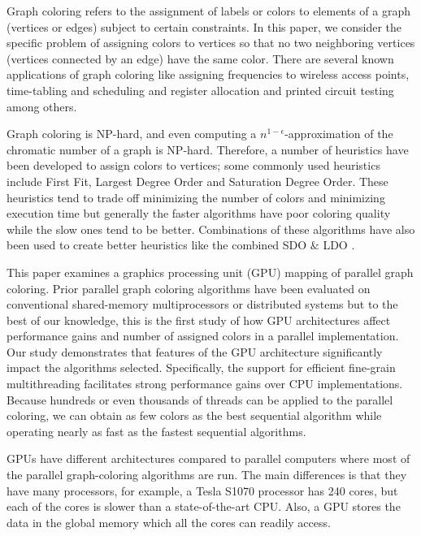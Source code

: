 \documentclass[preprint]{sigplanconf}
\begin{document}
Graph coloring refers to the assignment of labels or colors to elements of a graph (vertices or edges) subject to certain constraints. In this paper, we consider the specific problem of assigning colors to vertices so that no two neighboring vertices (vertices connected by an edge) have the same color. There are several known applications of graph coloring like assigning frequencies to wireless access points, time-tabling and scheduling and register allocation and printed circuit testing among others.

Graph coloring is NP-hard, and even computing a $n^{1-\epsilon}$-approximation of the chromatic number of a graph is NP-hard. Therefore, a number of heuristics have been developed to assign colors to vertices; some commonly used heuristics include First Fit, Largest Degree Order and Saturation Degree Order\cite{al2006new}.  These heuristics tend to trade off minimizing the number of colors and minimizing execution time but generally the faster algorithms have poor coloring quality while the slow ones tend to be better. Combinations of these algorithms have also been used to create better heuristics like the combined SDO $\&$ LDO \cite{al2006new}.

This paper examines a graphics processing unit (GPU) mapping of parallel graph coloring.  Prior parallel graph coloring algorithms have been evaluated on conventional shared-memory multiprocessors \cite{gebremedhin2000scalable} or distributed systems \cite{bozdag2008a} but to the best of our knowledge, this is the first study of how GPU architectures affect performance gains and number of assigned colors in a parallel implementation.  Our study demonstrates that features of the GPU architecture significantly impact the algorithms selected. Specifically, the support for efficient fine-grain multithreading facilitates strong performance gains over CPU implementations. Because hundreds or even thousands of threads can be applied to the parallel coloring, we can obtain as few colors as the best sequential algorithm while operating nearly as fast as the fastest sequential algorithms. 

GPUs have different architectures compared to parallel computers where most of the parallel graph-coloring algorithms are run. The main differences is that they have many processors, for example, a Tesla S1070 processor has 240 cores, but each of the cores is slower than a state-of-the-art CPU. Also, a GPU stores the data in the global memory which all the cores can readily access.
\end{document}
